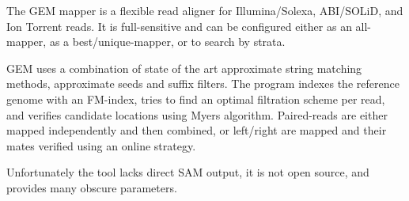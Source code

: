 The GEM mapper \citep{MarcoSola2012} is a flexible read aligner for Illumina/Solexa, ABI/SOLiD, and Ion Torrent reads.
It is full-sensitive and can be configured either as an all-mapper, as a best/unique-mapper, or to search by strata.

GEM uses a combination of state of the art approximate string matching methods, \eg approximate seeds and suffix filters.
The program indexes the reference genome with an FM-index, tries to find an optimal filtration scheme per read, and verifies candidate locations using Myers algorithm.
Paired-reads are either mapped independently and then combined, or left/right are mapped and their mates verified using an online strategy.

Unfortunately the tool lacks direct SAM output, it is not open source, and provides many obscure parameters.




\begin{landscape}
\begin{table}[h]
  \center
  \sffamily
	\renewcommand{\tabcolsep}{0.8ex}
	
\end{table}
\end{landscape}

